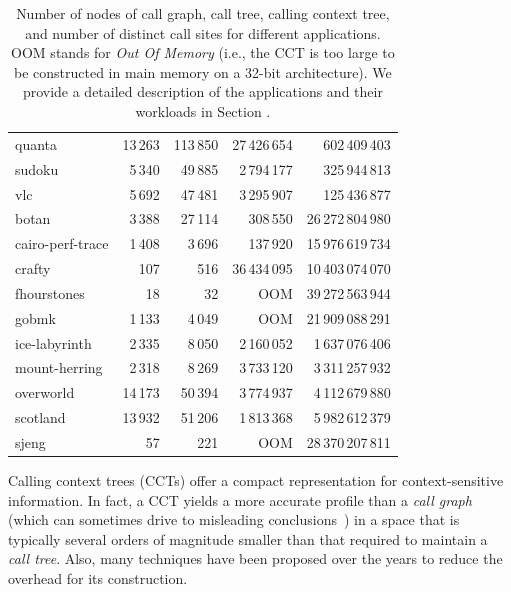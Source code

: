 \begin{table}[ht]
\begin{small}
\begin{tabular}{|l|r r r r|}
quanta & 13\,263 & 113\,850 & 27\,426\,654 & 602\,409\,403 \\
sudoku & 5\,340 & 49\,885 & 2\,794\,177 & 325\,944\,813 \\
vlc & 5\,692 & 47\,481 & 3\,295\,907 & 125\,436\,877 \\
\hline
\hline
botan & 3\,388 & 27\,114 & 308\,550 & 26\,272\,804\,980 \\
cairo-perf-trace & 1\,408 & 3\,696 & 137\,920 & 15\,976\,619\,734 \\
crafty & 107 & 516 & 36\,434\,095 & 10\,403\,074\,070 \\
fhourstones & 18 & 32 & OOM & 39\,272\,563\,944 \\
gobmk & 1\,133 & 4\,049 & OOM & 21\,909\,088\,291 \\
ice-labyrinth & 2\,335 & 8\,050 & 2\,160\,052 & 1\,637\,076\,406 \\
mount-herring & 2\,318 & 8\,269 & 3\,733\,120 & 3\,311\,257\,932 \\
overworld & 14\,173 & 50\,394 & 3\,774\,937 & 4\,112\,679\,880 \\
scotland & 13\,932 & 51\,206 & 1\,813\,368 & 5\,982\,612\,379 \\
sjeng & 57 & 221 & OOM & 28\,370\,207\,811 \\
\hline
\end{tabular}
\vspace{4mm}
\caption{\label{tab:hcct-CCTsize} Number of nodes of call graph, call tree, calling context tree, and number of distinct call sites for different applications. OOM stands for {\em Out Of Memory} (i.e., the CCT is too large to be constructed in main memory on a 32-bit architecture). We provide a detailed description of the applications and their workloads in Section \missing.
}
\end{small}
\end{table}
\ifauthorea{\newline}{\vspace{-4mm}}

\noindent Calling context trees (CCTs) offer a compact representation for context-sensitive information. In fact, a CCT yields a more accurate profile than a {\em call graph} (which can sometimes drive to misleading conclusions~\cite{Ponder88, Spivey04}) in a space that is typically several orders of magnitude smaller than
that
required to maintain a {\em call tree}. Also, many techniques have been proposed over the years to reduce the overhead for its construction.

